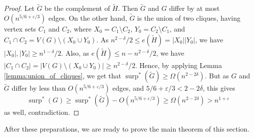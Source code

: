 \documentclass[11pt]{article}
\theoremstyle{plain}
\theoremstyle{definition}
\DeclareMathOperator{\surp}{surp}
\newcommand{\eps}{\varepsilon}
\begin{document}
\begin{proof}
Let $\widetilde{G}$ be the complement of $\widetilde{H}$. Then $\widetilde{G}$ and $G$ differ by at most $O(n^{5/6+\eps/3})$ edges. On the other hand, $\widetilde{G}$ is the union of two cliques, having vertex sets $C_1$ and $C_2$, where $X_0=C_1\setminus C_2$, $Y_0=C_2\setminus C_1$, and $C_1\cap C_2=V(G)\setminus (X_0\cup Y_0)$. As $n^{2-\delta}/2\leq e(\widetilde{H})=|X_0||Y_0|$, we have $|X_0|,|Y_0|\geq n^{1-\delta}/2$. Also, as $e(\widetilde{H})\leq n-n^{2-\delta}/2$, we have $|C_1\cap C_2|=|V(G)\setminus (X_0\cup Y_0)|\geq n^{2-\delta}/2$. Hence, by applying Lemma \ref{lemma:union_of_cliques}, we get that $\surp^*(\widetilde{G})\geq \Omega(n^{2-2\delta})$. But as $G$ and $\widetilde{G}$ differ by less than $O(n^{5/6+\eps/3})$ edges, and $5/6+\eps/3<2-2\delta$, this gives 
$$\surp^*(G)\geq \surp^*(\widetilde{G})-O(n^{5/6+\eps/3})\geq \Omega(n^{2-2\delta})>n^{1+\eps}$$ as well, contradiction.
\end{proof}

After these preparations, we are ready to prove the main theorem of this section.
\end{document}
